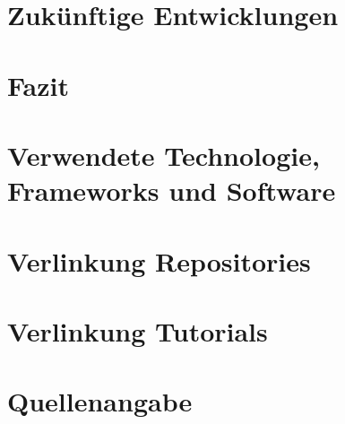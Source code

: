 \documentclass{scrartcl}
\begin{document}
\section{Zukünftige Entwicklungen}


\newpage

\section{Fazit}


\newpage

\section{Verwendete Technologie, Frameworks und Software}


\newpage

\section{Verlinkung Repositories}


\newpage

\section{Verlinkung Tutorials}


\newpage

\section{Quellenangabe}
\end{document}
